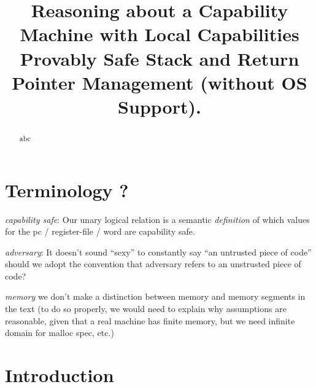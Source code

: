\documentclass[compsoc,conference,letterpaper,fleqn]{IEEEtran}
\begin{document}
\setlength{\mathindent}{.2cm}

\title{Reasoning about a Capability Machine with Local Capabilities\\
 Provably Safe Stack and Return Pointer Management (without OS Support).}


\author{%
 \and
{}
   \and
{}}

\maketitle

\begin{abstract}
  abc
\end{abstract}

\section*{Terminology ?}

\emph{capability safe}: 
Our unary logical relation is a semantic \emph{definition}
of which values for the
pc / register-file / word are capability safe. 

\emph{adversary}: It doesn't sound ``sexy'' to constantly say ``an untrusted
piece of code'' should we adopt the convention that adversary refers
to an unstrusted piece of code?

\emph{memory}  we don't make a distinction between memory and memory
segments in the text  (to do so properly, we would need to explain why
assumptions
are reasonable, given that a real machine has finite memory, but we
need infinite domain for malloc spec, etc.)


\section{Introduction}
\label{sec:introduction}
\end{document}
